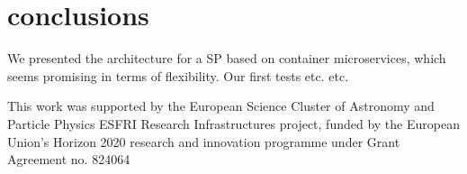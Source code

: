 \documentclass[11pt,twoside]{article}
\begin{document}
\section{conclusions}
We presented the architecture for a SP based on container microservices, which seems promising in terms of flexibility. Our first tests etc. etc.



\acknowledgements This work was supported by the European Science Cluster of Astronomy and Particle Physics ESFRI Research Infrastructures project, funded by the European Union’s Horizon 2020 research and innovation programme under Grant Agreement no. 824064




\end{document}
